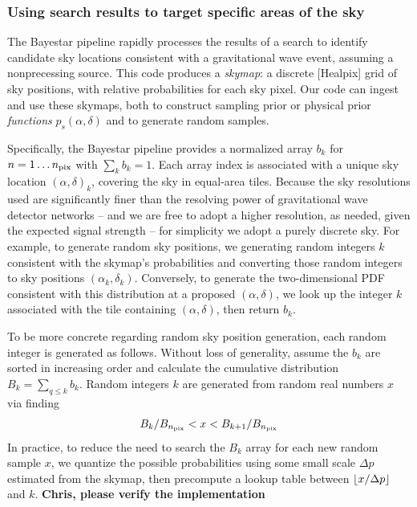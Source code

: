 \documentclass[twocolumn,prd,nofootinbib]{revtex4}
\DeclarePairedDelimiter\floor{\lfloor}{\rfloor}
\newcommand\BS{{\sc Bayestar}}
\begin{document}
\subsubsection{Using search results to target specific areas of the sky}

The \BS{} pipeline \cite{gw-astro-Bayestar} rapidly processes the results of a search to identify candidate sky
locations consistent with a gravitational wave event, assuming a nonprecessing source.   
%
This code produces a \emph{skymap}: a discrete [Healpix] grid of sky positions, with relative probabilities for each sky
pixel.  
%
Our code can ingest and use these skymaps,  both to construct sampling prior or physical prior \emph{functions}
$p_s(\alpha,\delta)$ and to generate random samples. 

Specifically, the \BS{} pipeline provides a normalized array  $b_k$  for $n=1\ldots n_{\rm pix}$ with $\sum_k b_k=1$.    
Each array index is associated with a unique sky location $(\alpha,\delta)_k $, covering the sky in equal-area tiles.  
%
Because the sky resolutions used are  significantly finer than the resolving power of gravitational wave detector
networks -- and we are free to adopt a higher resolution, as needed, given the expected signal strength -- 
 for simplicity we adopt a purely discrete sky.  For example, to generate  random sky positions, we generating random integers $k$ consistent with
the skymap's probabilities and converting those random integers to sky positions $(\alpha_k,\delta_k)$.  Conversely, to
generate the two-dimensional PDF consistent with this distribution at a proposed $(\alpha,\delta)$, we look up the
integer $k$ associated with the tile containing $(\alpha,\delta)$, then return $b_k$.  



To be more concrete regarding random sky position generation, each random integer is generated as follows. 
%
Without loss of generality, assume the $b_k$ are sorted in increasing order and calculate the cumulative distribution $B_k
= \sum_{q\le k} b_k$.   Random integers $k$ are generated from random real numbers $x$ via finding
\begin{eqnarray}
 B_k/B_{n_{\rm pix}} < x <  B_{k+1}/B_{n_{\rm pix}}
\end{eqnarray}
In practice, to reduce the need to search the $B_k$ array for each new random sample $x$, we quantize the possible probabilities
using some small scale $\Delta p$ estimated from the skymap, then  precompute a lookup table between $\floor*{x/\Delta
  p}$ and $k$.    \textbf{Chris, please verify the implementation}
\end{document}
